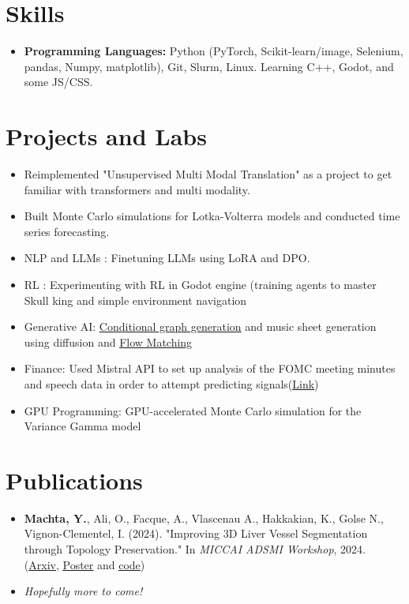 \documentclass[letterpaper,11pt,twocolumn]{article}
\newcommand{\resumeItem}[1]{\item \small{#1}}
\begin{document}
\section{Skills}
\begin{itemize}[leftmargin=*]
	\item \textbf{Programming Languages:} Python (PyTorch, Scikit-learn/image, Selenium, pandas, Numpy, matplotlib), Git, Slurm, Linux. Learning C++, Godot, and some JS/CSS.
\end{itemize}

\section{Projects and Labs}
\begin{itemize}[leftmargin=*]
	\resumeItem{Reimplemented "Unsupervised Multi Modal Translation" as a project to get familiar with transformers and multi modality.}
	\resumeItem{Built Monte Carlo simulations for Lotka-Volterra models and conducted time series forecasting.}
	\resumeItem{NLP and LLMs : Finetuning LLMs using LoRA and DPO. }
	\resumeItem{RL : Experimenting with RL in Godot engine (training agents to master Skull king and simple environment navigation}
	\resumeItem{Generative AI: \underline{\href{https://github.com/MachtaYassine/GGSP-ALTEGRAD/tree/main}{Conditional graph generation}} and music sheet generation using diffusion and \underline{\href{https://colab.research.google.com/drive/1HT1E62hvaACGgLNt3xu5m51AO4m_fTxO}{Flow Matching}}}
	\resumeItem{Finance: Used Mistral API to set up analysis of the FOMC meeting minutes and speech data in order to attempt predicting signals(\underline{\href{https://colab.research.google.com/drive/1qGfLkEFJ_ta2YnJD77EUxmsFi99Svo5X?usp=sharing}{Link}})}
	\resumeItem{GPU Programming: GPU-accelerated Monte Carlo simulation for the Variance Gamma model}
\end{itemize}

\section{Publications}
\begin{itemize}[leftmargin=*]
	\resumeItem{\textbf{Machta, Y.}, Ali, O., Facque, A., Vlascenau A., Hakkakian, K., Golse N., Vignon-Clementel, I. (2024). "Improving 3D Liver Vessel Segmentation through Topology Preservation." In \textit{MICCAI ADSMI Workshop}, 2024. (\href{https://arxiv.org/abs/2411.15778}{\underline{Arxiv}}, \href{https://MachtaYassine.github.io/Papers/2024_ADSMI_poster.pdf}{\underline{Poster}} and \underline{\href{https://gitlab.inria.fr/simbiotx/LiverVesselSeg}{code}})}
	\resumeItem{\textit{Hopefully more to come!}}
\end{itemize}
\end{document}
